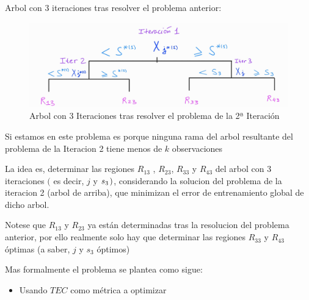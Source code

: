 \documentclass[
  11pt,
  a4paper,
]{article}
\providecommand{\tightlist}{%
  \setlength{\itemsep}{0pt}\setlength{\parskip}{0pt}}
\begin{document}
Arbol con 3 iteraciones tras resolver el problema anterior:

\begin{figure}
\centering
\includegraphics{output_528_0.jpg}
\caption{Arbol con 3 Iteraciones tras resolver el problema de la 2ª
Iteración}
\end{figure}

Si estamos en este problema es porque ninguna rama del arbol resultante
del problema de la Iteracion 2 tiene menos de \(k\) observaciones

La idea es, determinar las regiones \(R_{13}\) , \(R_{23}\), \(R_{33}\)
y \(R_{43}\) del arbol con 3 iteraciones \((\) es decir, \(j\) y
\(s_3 \hspace{0.05cm})\), considerando la solucion del problema de la
iteracion 2 (arbol de arriba), que minimizan el error de entrenamiento
global de dicho arbol.

Notese que \(R_{13}\) y \(R_{23}\) ya están determinadas tras la
resolucion del problema anterior, por ello realmente solo hay que
determinar las regiones \(R_{33}\) y \(R_{43}\) óptimas (a saber, \(j\)
y \(s_3\) óptimos)

\newpage

Mas formalmente el problema se plantea como sigue:

\begin{itemize}
\tightlist
\item
  Usando \(TEC\) como métrica a optimizar
\end{itemize}
\end{document}
